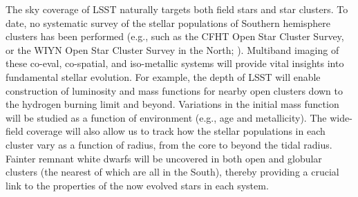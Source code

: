 The sky coverage of LSST naturally targets both field stars and star clusters.  To date, no systematic survey of the stellar
populations of Southern hemisphere clusters has been performed (e.g., such as the CFHT Open Star Cluster Survey, or
the WIYN Open Star Cluster Survey in the North; \citealt{2001AJ....122..257K,2000ASPC..198..517M}).  Multiband imaging of these co-eval,
co-spatial, and iso-metallic systems will provide vital insights into fundamental stellar evolution.  For example, the depth
of LSST will enable construction of  luminosity and mass functions for nearby open clusters down to the hydrogen burning
limit and beyond.  Variations in the initial mass function will be studied as a function of environment (e.g., age and metallicity).
The wide-field coverage will also allow us to track how the stellar populations in each cluster vary as a function of radius,
from the core to beyond the tidal radius. Fainter remnant white dwarfs will be uncovered in both open and globular clusters
(the nearest of which are all in the South), thereby providing a crucial link to the properties of the now evolved stars in each
system.



